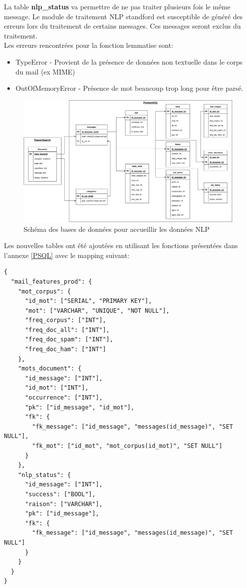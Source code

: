 \documentclass[a4paper,12pt]{article}
\begin{document}
		 	La table \textbf{nlp\_status} va permettre de ne pas traiter plusieurs fois le même message. Le module de traitement NLP standford est susceptible de généré des erreurs lors du traitement de certains messages. Ces messages seront exclus du traitement. \\
		 	
		 	Les erreurs rencontrées pour la fonction lemmatise sont:
		 	\begin{itemize}
		 		\item TypeError - Provient de la présence de données non textuelle dans le corps du mail (ex  MIME)
		 		\item OutOfMemoryError - Présence de mot beaucoup trop long pour être parsé. 
		 	\end{itemize}
		 	
			\begin{figure}[H]
				\includegraphics[width=\linewidth]{img/p2Bdd.png}
				\caption{Schéma des bases de données pour accueillir les données NLP}
			\end{figure}
			
			
			Les nouvelles tables ont été ajoutées en utilisant les fonctions présentées dans l'annexe \ref{PSQL} avec le mapping suivant:
			\begin{lstlisting}[title=Mapping nouvelles tables]
{
  "mail_features_prod": {
    "mot_corpus": {
      "id_mot": ["SERIAL", "PRIMARY KEY"],
      "mot": ["VARCHAR", "UNIQUE", "NOT NULL"],
      "freq_corpus": ["INT"],
      "freq_doc_all": ["INT"],
      "freq_doc_spam": ["INT"],
      "freq_doc_ham": ["INT"]
    },
    "mots_document": {
      "id_message": ["INT"],
      "id_mot": ["INT"],
      "occurrence": ["INT"],
      "pk": ["id_message", "id_mot"],
      "fk": {
        "fk_message": ["id_message", "messages(id_message)", "SET NULL"],
        "fk_mot": ["id_mot", "mot_corpus(id_mot)", "SET NULL"]
      }
    },
    "nlp_status": {
      "id_message": ["INT"],
      "success": ["BOOL"],
      "raison": ["VARCHAR"],
      "pk": ["id_message"],
      "fk": {
        "fk_message": ["id_message", "messages(id_message)", "SET NULL"]
      }
    }
  }
}
			\end{lstlisting}
			
\end{document}
